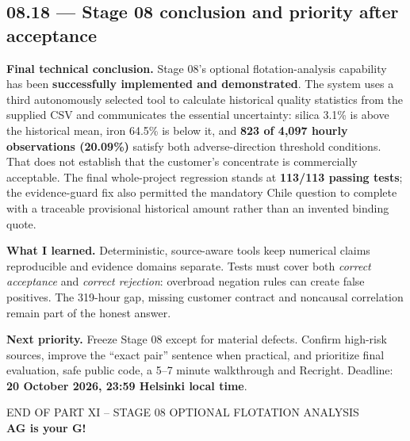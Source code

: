 \documentclass[11pt,a4paper]{article}
\begin{document}
\subsection{08.18 --- Stage 08 conclusion and priority after acceptance}
\begin{keybox}
\textbf{Final technical conclusion.} Stage 08's optional flotation-analysis capability has been \textbf{successfully implemented and demonstrated}. The system uses a third autonomously selected tool to calculate historical quality statistics from the supplied CSV and communicates the essential uncertainty: silica 3.1\% is above the historical mean, iron 64.5\% is below it, and \textbf{823 of 4,097 hourly observations (20.09\%)} satisfy both adverse-direction threshold conditions. That does not establish that the customer's concentrate is commercially acceptable. The final whole-project regression stands at \textbf{113/113 passing tests}; the evidence-guard fix also permitted the mandatory Chile question to complete with a traceable provisional historical amount rather than an invented binding quote.
\end{keybox}

\textbf{What I learned.} Deterministic, source-aware tools keep numerical claims reproducible and evidence domains separate. Tests must cover both \emph{correct acceptance} and \emph{correct rejection}: overbroad negation rules can create false positives. The 319-hour gap, missing customer contract and noncausal correlation remain part of the honest answer.

\textbf{Next priority.} Freeze Stage 08 except for material defects. Confirm high-risk sources, improve the ``exact pair'' sentence when practical, and prioritize final evaluation, safe public code, a 5--7 minute walkthrough and Recright. Deadline: \textbf{20 October 2026, 23:59 Helsinki local time}.

\vspace{1mm}
\begin{center}
{\sffamily\color{Gray}\footnotesize END OF PART XI -- STAGE 08 OPTIONAL FLOTATION ANALYSIS}\\[2mm]
{\sffamily\bfseries\color{Navy}AG is your G!}
\end{center}

\clearpage
\end{document}
